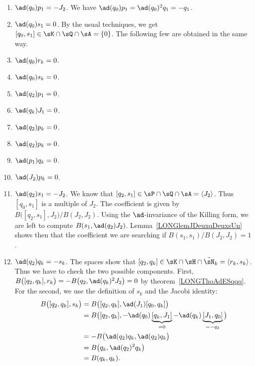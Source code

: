 \begin{enumerate}
	\item$\ad(q_0)p_1=-J_2$\label{LONGItemComqzpun}. We have $\ad(q_0)p_1=\ad(q_0)^2q_1=-q_1$.
	\item$\ad(q_0)s_1=0$. By the usual techniques, we get $[q_0,s_1]\in\sK\cap\sQ\cap\sA=\{ 0 \}$. The following few are obtained in the same way.
	\item$\ad(q_0)r_k=0$\label{LONGItemComqzrk}.
	\item$\ad(q_0)s_k=0$.
	\item$\ad(q_2)p_1=0$.
	\item$\ad(q_k)J_1=0$.
	\item$\ad(q_2)p_k=0$.
	\item$\ad(q_2)p_k=0$.
	\item$\ad(p_1)q_k=0$\label{LONGItemCompunqk}.
	\item$\ad(J_2)p_k=0$.
	\item$\ad(q_2)s_1=-J_2$. We know that $[q_2,s_1]\in\sP\cap\sQ\cap\sA=\langle J_2\rangle$. Thus $[q_0,s_1]$ is a multiple of $J_2$. The coefficient is given by$B\big( [q_2,s_1],J_2 \big)/B(J_2,J_2)$. Using the $\ad$-invariance of the Killing form, we are left to compute $B(s_1,\ad(q_2)J_2)$. Lemma~\ref{LONGlemJDeuxqDeuxsUn} shows then that the coefficient we are searching if $B(s_1,s_1)/B(J_2,J_2)=1$.
	\item\label{LONGItemComqdeuxqk}$\ad(q_2)q_k=-s_k$. The spaces show that $[q_2,q_k]\in\sK\cap\sH\cap\tilde\sN_k=\langle r_k,s_k\rangle$. Thus we have to check the two possible components. First, $B\big( [q_2,q_k],r_k \big)=-B\big( q_2,\ad(q_k)^2J_2 \big)=0$ by theorem~\ref{LONGThoAdESqqq}. For the second, we use the definition of $s_k$ and the Jacobi identity:
	\begin{equation}
		\begin{aligned}[]
			B\big( [q_2,q_k],s_k \big) & =B\big( [q_2,q_k],\ad(J_1)[q_0,q_k] \big)                                                           \\
			                           & =B\big( [q_2,q_k],-\ad(q_0)\underbrace{[q_k,J_1]}_{=0}-\ad(q_k)\underbrace{[J_1,q_0]}_{=-q_2} \big) \\
			                           & =-B\big( \ad(q_2)q_k,\ad(q_2)q_k \big)                                                              \\
			                           & =B\big( q_k,\ad(q_2)^2q_k \big)                                                                     \\
			                           & =B(q_k,q_k).
		\end{aligned}

\end{equation}
\end{enumerate}

